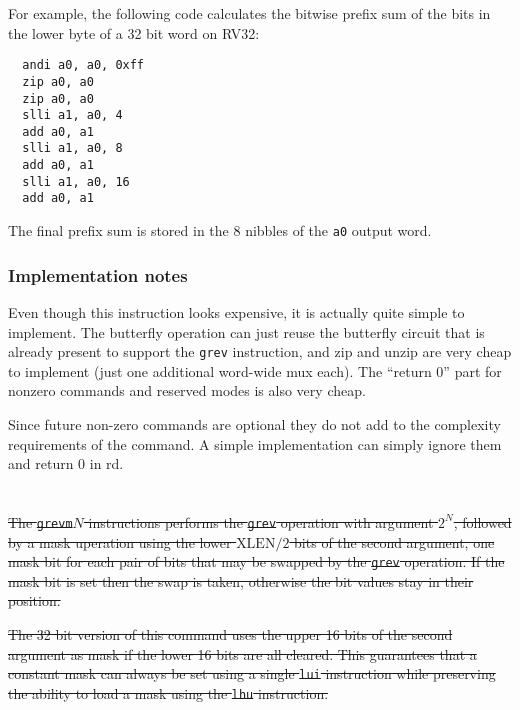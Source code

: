For example, the following code calculates the bitwise prefix sum of the bits
in the lower byte of a 32 bit word on RV32:

\begin{verbatim}
  andi a0, a0, 0xff
  zip a0, a0
  zip a0, a0
  slli a1, a0, 4
  add a0, a1
  slli a1, a0, 8
  add a0, a1
  slli a1, a0, 16
  add a0, a1
\end{verbatim}

The final prefix sum is stored in the 8 nibbles of the {\tt a0} output word.

\subsubsection{Implementation notes}

Even though this instruction looks expensive, it is actually quite simple to
implement.  The butterfly operation can just reuse the butterfly circuit that
is already present to support the {\tt grev} instruction, and zip and unzip are
very cheap to implement (just one additional word-wide mux each). The ``return
0'' part for nonzero commands and reserved modes is also very cheap.

Since future non-zero commands are optional they do not add to the complexity
requirements of the command. A simple implementation can simply ignore them
and return 0 in rd.


\section{}

\sout{
The \texttt{grevm}$N$ instructions performs the \texttt{grev} operation
with argument $2^N$, followed by a mask uperation using the lower
$\textrm{XLEN}/2$ bits of the second argument, one mask bit for each pair of bits
that may be swapped by the \texttt{grev} operation. If the mask bit
is set then the swap is taken, otherwise the bit values stay in their
position.
}

\sout{
The 32 bit version of this command uses the upper 16 bits of the second argument
as mask if the lower 16 bits are all cleared. This guarantees that a constant
mask can always be set using a single {\tt lui} instruction while preserving
the ability to load a mask using the {\tt lhu} instruction.
}


